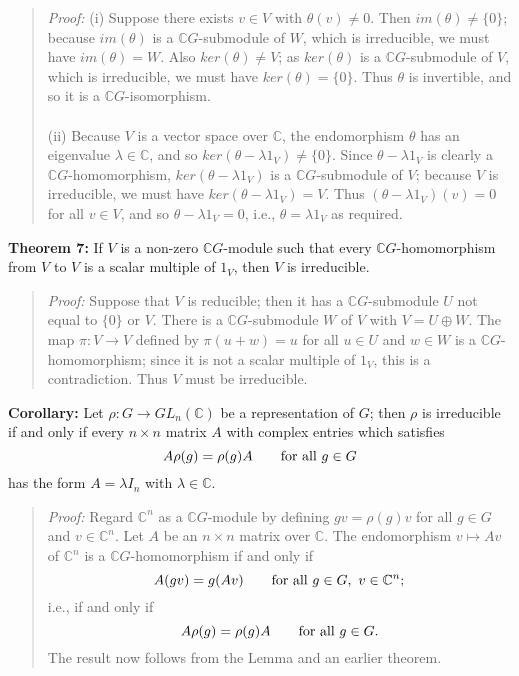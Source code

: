 \begin{quote}
\emph{Proof:}  
(i) Suppose there exists $v\in V$ with $\theta(v)\neq0$. Then
$im(\theta) \neq \{0\}$; because $im(\theta)$ is a ${\mathbb C}G$-submodule of $W$, which
is irreducible, we must have $im(\theta)=W$. Also $ker(\theta) \neq V$; as
$ker(\theta)$ is a ${\mathbb C}G$-submodule of $V$, which is irreducible, we must have
$ker(\theta)=\{0\}$. Thus $\theta$ is invertible, and so it is a
${\mathbb C}G$-isomorphism.
\\
\\
(ii) Because $V$ is a vector space over ${\mathbb C}$, the endomorphism
$\theta$ has an eigenvalue $\lambda\in{\mathbb C}$, and so
$ker(\theta-\lambda1_V) \neq \{0\}$. Since $\theta-\lambda1_V$ is clearly a
${\mathbb C}G$-homomorphism, $ker(\theta-\lambda1_V)$ is a ${\mathbb C}G$-submodule of
$V$; because $V$ is irreducible, we must have $ker(\theta-\lambda1_V)=V$. Thus
$(\theta-\lambda1_V)(v)=0$ for all $v\in V$, and so $\theta-\lambda1_V=0$,
i.e., $\theta=\lambda1_V$ as required.
\end{quote}
{\bf Theorem 7:} If $V$ is a non-zero ${\mathbb C}G$-module such that
every ${\mathbb C}G$-homomorphism from $V$ to $V$ is a scalar multiple of $1_V$, then
$V$ is irreducible.
\begin{quote}
\emph{Proof:}
Suppose that $V$ is reducible; then it has a ${\mathbb C}G$-submodule $U$ not equal
to $\{0\}$ or $V$. There is a ${\mathbb C}G$-submodule $W$ of $V$ with
$V=U\oplus W$. The map $\pi:V\rightarrow V$ defined by
$\pi(u+w)=u$ for all $u\in U$ and $w\in W$ is a ${\mathbb C}G$-homomorphism; since it is
not a scalar multiple of $1_V$, this is a contradiction. Thus $V$ must be
irreducible.
\end{quote}
{\bf Corollary:} Let $\rho: G\rightarrow GL_n({\mathbb C})$ be a
representation of $G$; then $\rho$ is irreducible if and only if every
$n\times n$ matrix $A$ with complex entries which satisfies
$$A\rho(g)=\rho(g)A\qquad\hbox{for all }g\in G$$
has the form $A=\lambda I_n$ with $\lambda\in{\mathbb C}$.
\begin{quote}
\emph{Proof:}
Regard ${\mathbb C}^n$ as a ${\mathbb C}G$-module by defining
$gv=\rho(g)v$ for all $g\in G$ and $v\in{\mathbb C}^n$. Let $A$ be an $n\times n$ matrix
over ${\mathbb C}$. The endomorphism $v\mapsto Av$ of 
${\mathbb C}^n$ is a ${\mathbb C}G$-homomorphism
if and only if
$$A(gv)=g(Av)\qquad\hbox{for all }g\in G,\ v\in{\mathbb C}^n;$$
i.e., if and only if
$$A\rho(g)=\rho(g)A\qquad\hbox{for all }g\in G.$$
The result now follows from the Lemma and an earlier theorem.
\end{quote}
